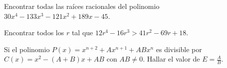     \begin{problem}
        Encontrar todas las raíces racionales del polinomio $30x^4 - 133 x^3 - 121x^2 + 189x - 45$.
    \end{problem}

    \begin{problem}
        Encontrar todos los $r$ tal que $12r^4 - 16r^3 > 41r^2 - 69r + 18$.
    \end{problem}

    \begin{problem}
        Si el polinomio $P(x) = x^{n + 2} + Ax^{n + 1} + ABx^n$ es divisible por $C(x) = x^2 - (A + B)x + AB$ con $AB \neq 0$.
        Hallar el valor de $E = \frac{A}{B}$.
    \end{problem}